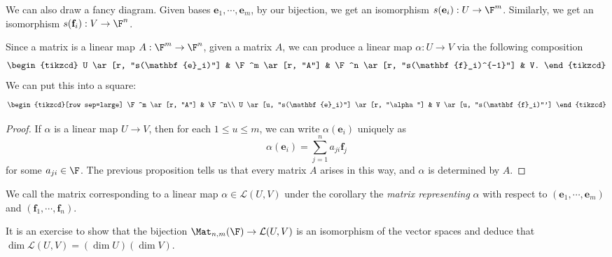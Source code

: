 \documentclass[a4paper]{article}
\begin{document}
We can also draw a fancy diagram. Given bases $\mathbf{e}_1, \cdots, \mathbf{e}_m$, by our bijection, we get an isomorphism $s(\mathbf{e}_i): U\to \F^m$. Similarly, we get an isomorphism $s(\mathbf{f}_i): V\to \F^n$.

Since a matrix is a linear map $A: \F^m \to \F^n$, given a matrix $A$, we can produce a linear map $\alpha: U\to V$ via the following composition
\[
  \begin{tikzcd}
    U \ar[r, "s(\mathbf{e}_i)"] & \F^m \ar[r, "A"] & \F^n \ar[r, "s(\mathbf{f}_i)^{-1}"] & V.
  \end{tikzcd}
\]
We can put this into a square:
\[
  \begin{tikzcd}[row sep=large]
    \F^m \ar[r, "A"] & \F^n\\
    U \ar[u, "s(\mathbf{e}_i)"] \ar[r, "\alpha"] & V \ar[u, "s(\mathbf{f}_i)"']
  \end{tikzcd}
\]
\begin{proof}
  If $\alpha$ is a linear map $U \to V$, then for each $1 \leq u \leq m$, we can write $\alpha(\mathbf{e}_i)$ uniquely as
  \[
    \alpha(\mathbf{e}_i) = \sum_{j = 1}^n a_{ji} \mathbf{f}_j
  \]
  for some $a_{ji} \in \F$. The previous proposition tells us that every matrix $A$ arises in this way, and $\alpha$ is determined by $A$.
\end{proof}

\begin{defi}
  We call the matrix corresponding to a linear map $\alpha\in \mathcal{L}(U, V)$ under the corollary the \emph{matrix representing} $\alpha$ with respect to $(\mathbf{e}_1, \cdots, \mathbf{e}_m)$ and $(\mathbf{f}_1, \cdots, \mathbf{f}_n)$.
\end{defi}

It is an exercise to show that the bijection $\Mat_{n, m}(\F) \to \mathcal{L}(U, V)$ is an isomorphism of the vector spaces and deduce that $\dim \mathcal{L}(U, V) = (\dim U)(\dim V)$.
\end{document}
